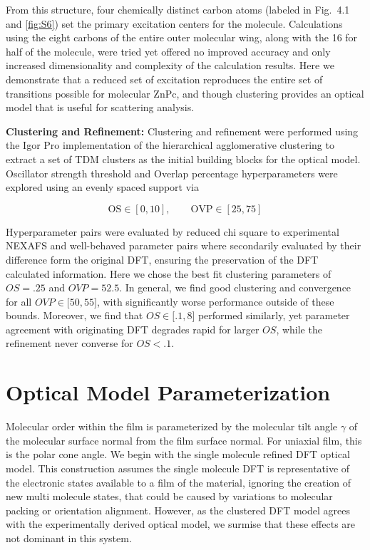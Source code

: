 From this structure, four chemically distinct carbon atoms (labeled in Fig.~4.1 and \cref{fig:S6}) set the primary excitation centers for the molecule. Calculations using the eight carbons of the entire outer molecular wing, along with the 16 for half of the molecule, were tried yet offered no improved accuracy and only increased dimensionality and complexity of the calculation results. Here we demonstrate that a reduced set of excitation reproduces the entire set of transitions possible for molecular ZnPc, and though clustering provides an optical model that is useful for scattering analysis.

\textbf{Clustering and Refinement:} Clustering and refinement were performed using the Igor Pro implementation of the hierarchical agglomerative clustering to extract a set of TDM clusters as the initial building blocks for the optical model. Oscillator strength threshold and Overlap percentage hyperparameters were explored using an evenly spaced support via

\begin{equation*}
  \mathrm{OS} \in [0, 10], \qquad \mathrm{OVP} \in [25, 75]
\end{equation*}

Hyperparameter pairs were evaluated by reduced chi square to experimental NEXAFS and well-behaved parameter pairs where secondarily evaluated by their difference form the original DFT, ensuring the preservation of the DFT calculated information. Here we chose the best fit clustering parameters of \(OS = .25\) and \(OVP = 52.5\). In general, we find good clustering and convergence for all \(OVP \in \lbrack 50,55\rbrack\), with significantly worse performance outside of these bounds. Moreover, we find that \(OS \in \lbrack.1,8\rbrack\) performed similarly, yet parameter agreement with originating DFT degrades rapid for larger \(OS\), while the refinement never converse for \(OS < .1\).

\section{Optical Model Parameterization}\label{sec:optical-model-parameterization}

Molecular order within the film is parameterized by the molecular tilt angle \(\gamma\) of the molecular surface normal from the film surface normal. For uniaxial film, this is the polar cone angle. We begin with the single molecule refined DFT optical model. This construction assumes the single molecule DFT is representative of the electronic states available to a film of the material, ignoring the creation of new multi molecule states, that could be caused by variations to molecular packing or orientation alignment. However, as the clustered DFT model agrees with the experimentally derived optical model, we surmise that these effects are not dominant in this system.

